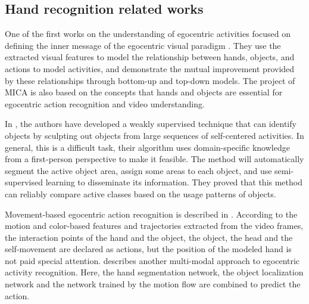 \subsection{Hand recognition related works}
One of the first works on the understanding of egocentric activities focused on defining the inner message of the egocentric visual paradigm \cite{10.1109/ICCV.2011.6126269}. They use the extracted visual features to model the relationship between hands, objects, and actions to model activities, and demonstrate the mutual improvement provided by these relationships through bottom-up and top-down models. The project of MICA is also based on the concepts that hands and objects are essential for egocentric action recognition and video understanding.

In \cite{5995444}, the authors have developed a weakly supervised technique that can identify objects by sculpting out objects from large sequences of self-centered activities. In general, this is a difficult task, their algorithm uses domain-specific knowledge from a first-person perspective to make it feasible. The method will automatically segment the active object area, assign some areas to each object, and use semi-supervised learning to disseminate its information. They proved that this method can reliably compare active classes based on the usage patterns of objects.

Movement-based egocentric action recognition is described in \cite{7298625}. According to the motion and color-based features and trajectories extracted from the video frames, the interaction points of the hand and the object, the object, the head and the self-movement are declared as actions, but the position of the modeled hand is not paid special attention. \cite{7780578} describes another multi-modal approach to egocentric activity recognition. Here, the hand segmentation network, the object localization network and the network trained by the motion flow are combined to predict the action.


